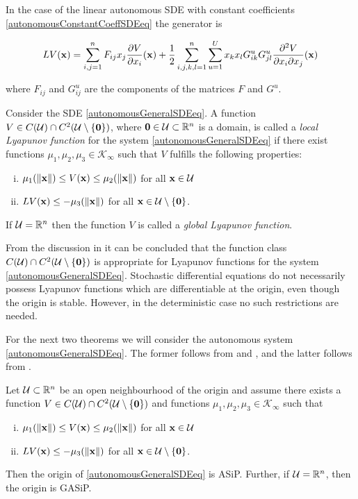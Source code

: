 \documentclass[a4paper,12pt,twoside,BCOR=10mm]{scrbook}
\begin{document}
In the case of the linear autonomous SDE with constant coefficients \eqref{autonomousConstantCoeffSDEeq} the generator is

\begin{align*}
    LV(\mathbf{x}) = \sum\limits_{i,j = 1}^nF_{ij}x_j\frac{\partial V}{\partial x_i}(\mathbf{x}) + \frac{1}{2}\sum\limits_{i,j,k,l = 1}^n\sum\limits_{u = 1}^Ux_k x_l G_{ik}^u G_{jl}^u \frac{\partial^2 V}{\partial x_i \partial x_j}(\mathbf{x})
\end{align*}

where $F_{ij}$ and $G_{ij}^u$ are the components of the matrices $F$ and $G^u$.

\begin{definition}
    Consider the SDE \eqref{autonomousGeneralSDEeq}. A function $V\in C(\mathcal{U})\cap C^2(\mathcal{U}\setminus \{\mathbf{0}\})$, where $\mathbf{0} \in \mathcal{U} \subset \mathbb{R}^{n}$ is a domain, is called a \textit{local Lyapunov function} for the system \eqref{autonomousGeneralSDEeq} if there exist functions $\mu_1, \mu_2, \mu_3 \in \mathcal{K}_\infty$ such that $V$ fulfills the following properties:
    \begin{enumerate}[i)]
        \item $\mu_1(\left\lVert\mathbf{x}\right\rVert) \leq V(\mathbf{x}) \leq \mu_2(\left\lVert\mathbf{x}\right\rVert)$ for all $\mathbf{x}\in \mathcal{U}$
        \item $LV(\mathbf{x}) \leq -\mu_3(\left\lVert\mathbf{x}\right\rVert)$ for all $\mathbf{x} \in \mathcal{U}\setminus \{\mathbf{0}\}$.
    \end{enumerate}
    If $\mathcal{U} = \mathbb{R}^{n}$ then the function $V$ is called a \textit{global Lyapunov function}.
\end{definition}

From the discussion in \citep[p. 146]{sdestab2012khaminskii} it can be concluded that the function class $C(\mathcal{U})\cap C^2(\mathcal{U}\setminus \{\mathbf{0}\})$ is appropriate for Lyapunov functions for the system \eqref{autonomousGeneralSDEeq}. Stochastic differential equations do not necessarily possess Lyapunov functions which are differentiable at the origin, even though the origin is stable. However, in the deterministic case no such restrictions are needed.
 
For the next two theorems we will consider the autonomous system \eqref{autonomousGeneralSDEeq}. The former follows from \citep[Corollary 5.11]{sdestab2012khaminskii} and \citep[Theorem 5.8]{sdestab2012khaminskii}, and the latter follows from \citep[Theorem 5.11]{sdestab2012khaminskii}.

\begin{theorem}
Let $\mathcal{U} \subset \mathbb{R}^{n}$ be an open neighbourhood of the origin and assume there exists a function $V\in C(\mathcal{U})\cap C^2(\mathcal{U}\setminus \{\mathbf{0}\})$ and functions $\mu_1, \mu_2, \mu_3 \in \mathcal{K}_\infty$ such that
\begin{enumerate} [i)]
    \item $\mu_1(\left\lVert\mathbf{x}\right\rVert) \leq V(\mathbf{x}) \leq \mu_2(\left\lVert\mathbf{x}\right\rVert)$ for all $\mathbf{x} \in \mathcal{U}$
    \item $LV(\mathbf{x}) \leq -\mu_3(\left\lVert\mathbf{x}\right\rVert)$ for all $\mathbf{x}\in \mathcal{U}\setminus \{\mathbf{0}\}$.
\end{enumerate}
Then the origin of \eqref{autonomousGeneralSDEeq} is ASiP. Further, if $\mathcal{U} = \mathbb{R}^{n}$, then the origin is GASiP.
\end{theorem}
\end{document}

